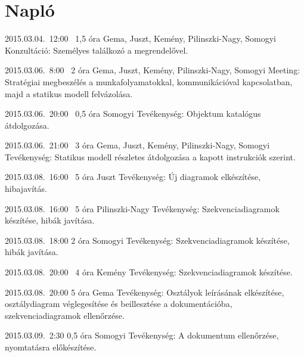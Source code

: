 %
\section{Napló}

\begin{naplo}
	
\bejegyzes
{2015.03.04.~12:00~} %
{1,5 óra} %
{Gema, Juszt, Kemény, Pilinszki-Nagy, Somogyi} %
{Konzultáció: Személyes találkozó a megrendelővel.} %

\bejegyzes
{2015.03.06.~8:00~} %
{2 óra} %
{Gema, Juszt, Kemény, Pilinszki-Nagy, Somogyi} %
{Meeting: Stratégiai megbeszélés a munkafolyamatokkal, kommunikációval kapcsolatban, majd a statikus modell felvázolása.} %

\bejegyzes
{2015.03.06.~20:00~} %
{0,5 óra} %
{Somogyi} %
{Tevékenység: Objektum katalógus átdolgozása.} %

\bejegyzes
{2015.03.06.~21:00~}
{3 óra}
{Gema, Juszt, Kemény, Pilinszki-Nagy, Somogyi}
{Tevékenység: Statikus modell részletes átdolgozása a kapott instrukciók szerint.}

\bejegyzes
{2015.03.08.~16:00~} %
{5 óra} %
{Juszt} %
{Tevékenység: Új diagramok elkészítése, hibajavítás.} %

\bejegyzes
{2015.03.08.~16:00~} %
{5 óra} %
{Pilinszki-Nagy} %
{Tevékenység: Szekvenciadiagramok készítése, hibák javítása.} %

\bejegyzes
{2015.03.08.~18:00}
{2 óra}
{Somogyi}
{Tevékenység: Szekvenciadiagramok készítése, hibák javítása.}

\bejegyzes
{2015.03.08.~20:00~} %
{4 óra} %
{Kemény} %
{Tevékenység: Szekvenciadiagramok készítése.} %

\bejegyzes
{2015.03.08.~20:00} %
{5 óra} %
{Gema} %
{Tevékenység: Osztályok leírásának elkészítése, osztálydiagram véglegesítése és beillesztése a dokumentációba, szekvenciadiagramok ellenőrzése.} %

\bejegyzes
{2015.03.09.~2:30}
{0,5 óra}
{Somogyi}
{Tevékenység: A dokumentum ellenőrzése, nyomtatásra előkészítése.}


\end{naplo}

